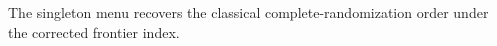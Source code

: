 The singleton menu recovers the classical complete-randomization order under the corrected frontier index.